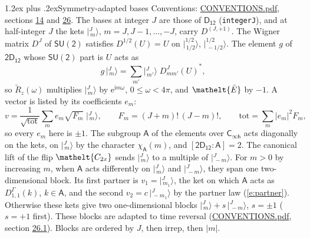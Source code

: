 \documentclass[10pt,a4paper]{article}
\makeatletter
\renewcommand\section{\@startsection{section}{1}{\z@}{-3ex plus -1ex minus -.2ex}%
  {1.2ex plus .2ex}{\normalfont\large\sffamily\bfseries\color{parttitle}}}
\numberwithin{equation}{section}
\newcommand{\eltfont}[1]{{\let\sigma\eltsigma\mathelt{#1}}}
\newcommand{\grp}[1]{\mathsf{#1}}
\newcommand{\elt}[1]{\eltfont{#1}}
\newcommand{\grpindex}[2]{[#1 : #2]}
\newcommand{\iunit}{\mathrm{i}}
\newcommand{\expe}{\mathrm{e}}
\newcommand{\irrJp}[2]{D^{(#1,#2)}}
\newcommand{\repD}[1]{D^{#1}}
\newcommand{\wignerD}[1]{D^{#1}}
\newcommand{\chiA}{\chi_{\grp{A}}}
\newcommand{\conj}[1]{{#1}^{*}}
\newcommand{\jm}[2]{\bigl\lvert{}^{#1}_{\,#2}\bigr\rangle}
\newcommand{\barred}[1]{\bar{#1}}
\newcommand{\lift}[1]{\tilde{#1}}
\makeatother
\begin{document}
\section{Symmetry-adapted bases}\label{s:bases}
Conventions: \href{../../CONVENTIONS.pdf}{CONVENTIONS.pdf}, sections \href{../../../rotation/CONVENTIONS.pdf\#conv.14}{14} and \href{../../CONVENTIONS.pdf\#conv.26}{26}.
\leavevmode\label{n:index.m}\label{n:vector.ket}The bases at integer $J$ are those of \href{../../../rotation/data/pdf/D12.pdf}{$\grp{D_{12}}$} (\texttt{integerJ}), and at half-integer $J$ the kets $\jm{J}{m}$, $m = J, J-1, \dots, -J$, carry $\irrJp{J}{+1}$. \label{n:matrix.wigner}The Wigner matrix $\wignerD{J}$ of $\grp{SU(2)}$ satisfies $\wignerD{1/2}(U) = U$ on $\jm{1/2}{1/2}$, $\jm{1/2}{-1/2}$. The element $g$ of $\grp{2D_{12}}$ whose $\grp{SU(2)}$ part is $U$ acts as
\begin{equation}\label{e:action}g\,\jm{J}{m} = \sum_{m'} \jm{J}{m'}\; \conj{\wignerD{J}_{m m'}(U)},\end{equation}
so $\lift{R}_{z}(\omega)$ multiplies $\jm{J}{m}$ by $\expe^{\iunit m\omega}$, $0 \le \omega < 4\pi$, and $\elt{\barred{E}}$ by $-1$. \label{n:index.ketcoefficient}\label{n:vector.basis.symmetry}\label{n:index.ketweight}\label{n:index.total}A vector is listed by its coefficients $e_m$:
\begin{equation}\label{e:ket}v = \frac{1}{\sqrt{\mathrm{tot}}}\sum_m e_m\sqrt{F_m}\;\jm{J}{m},\qquad F_m = (J+m)!\,(J-m)!,\qquad \mathrm{tot} = \sum_m |e_m|^2F_m,\end{equation}
so every $e_m$ here is $\pm 1$.
\leavevmode\label{n:group.A}\label{n:function.character.abelian}The subgroup $\grp{A}$ of the elements over $\grp{C_{\infty h}}$ acts diagonally on the kets, on $\jm{J}{m}$ by the character $\chiA(m)$, and $\grpindex{\grp{2D_{12}}}{\grp{A}} = 2$. The canonical lift of the flip $\elt{C_{2x}}$ sends $\jm{J}{m}$ to a multiple of $\jm{J}{-m}$. For $m > 0$ by increasing $m$, when $\grp{A}$ acts differently on $\jm{J}{m}$ and $\jm{J}{-m}$, they span one two-dimensional block. \label{n:index.partner.sign}Its first partner is $v_1 = \jm{J}{m_1}$, the ket on which $\grp{A}$ acts as $\repD{\Gamma}_{1,1}(k)$, $k \in \grp{A}$, and the second $v_2 = c\,\jm{J}{-m_1}$ by the partner law (\ref{e:partner}). \label{n:index.pair.sign}Otherwise these kets give two one-dimensional blocks $\jm{J}{m} + s\,\jm{J}{-m}$, $s = \pm 1$ ($s = +1$ first). These blocks are adapted to time reversal (\href{../../CONVENTIONS.pdf}{CONVENTIONS.pdf}, section \href{../../CONVENTIONS.pdf\#conv.26.1}{26.1}). Blocks are ordered by $J$, then irrep, then $|m|$.
\end{document}
